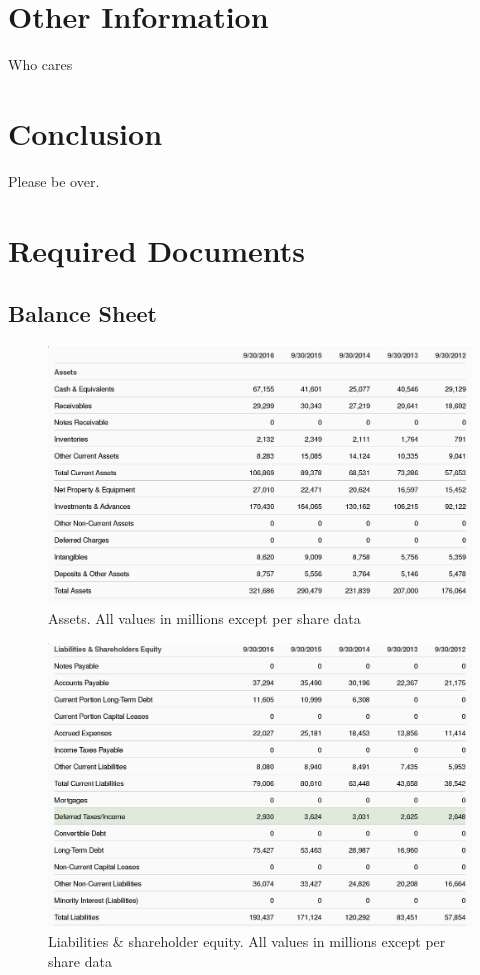 \documentclass[12pt,a4paper,titlepage]{article}
\begin{document}
\section{Other Information}
Who cares

\section{Conclusion}
Please be over.

\newpage

\section{Required Documents}
\subsection{Balance Sheet}
\begin{figure}[!htb]
  \centering
  \includegraphics[width=1\textwidth]{assets}
    \caption{Assets. All values in millions except per share data~\cite{zacks-bal}}
\end{figure}

\begin{figure}[!htb]
  \centering
  \includegraphics[width=.9\textwidth]{liabilities}
    \caption{Liabilities \& shareholder equity. All values in millions except
      per share data~\cite{zacks-bal}}
\end{figure}
\end{document}
